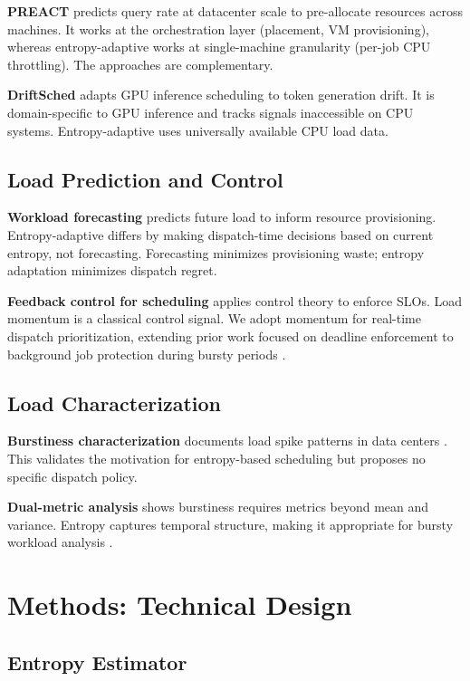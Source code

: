 \documentclass[11pt,letterpaper]{article}
\begin{document}
\textbf{PREACT} \cite{Kraska2018} predicts query rate at datacenter scale to pre-allocate resources across machines. It works at the orchestration layer (placement, VM provisioning), whereas entropy-adaptive works at single-machine granularity (per-job CPU throttling). The approaches are complementary.

\textbf{DriftSched} \cite{Palaniappan2026} adapts GPU inference scheduling to token generation drift. It is domain-specific to GPU inference and tracks signals inaccessible on CPU systems. Entropy-adaptive uses universally available CPU load data.

\subsection{Load Prediction and Control}

\textbf{Workload forecasting} predicts future load to inform resource provisioning. Entropy-adaptive differs by making dispatch-time decisions based on current entropy, not forecasting. Forecasting minimizes provisioning waste; entropy adaptation minimizes dispatch regret.

\textbf{Feedback control for scheduling} applies control theory to enforce SLOs. Load momentum is a classical control signal. We adopt momentum for real-time dispatch prioritization, extending prior work focused on deadline enforcement to background job protection during bursty periods \cite{Stankovic1995}.

\subsection{Load Characterization}

\textbf{Burstiness characterization} documents load spike patterns in data centers \cite{Bodik2010}. This validates the motivation for entropy-based scheduling but proposes no specific dispatch policy.

\textbf{Dual-metric analysis} shows burstiness requires metrics beyond mean and variance. Entropy captures temporal structure, making it appropriate for bursty workload analysis \cite{Balaji2019}.

\section{Methods: Technical Design}

\subsection{Entropy Estimator}
\end{document}
